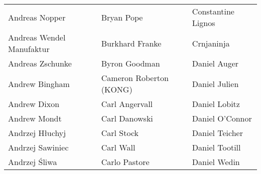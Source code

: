 \begin{tabular}{p{4.5cm}p{4.5cm}p{4.5cm}}
Andreas Nopper & Bryan Pope & Constantine Lignos \\
Andreas Wendel Manufaktur & Burkhard Franke & Crnjaninja \\
Andreas Zschunke & Byron Goodman & Daniel Auger \\
Andrew Bingham & Cameron Roberton (KONG) & Daniel Julien \\
Andrew Dixon & Carl Angervall & Daniel Lobitz \\
Andrew Mondt & Carl Danowski & Daniel O'Connor \\
Andrzej Hłuchyj & Carl Stock & Daniel Teicher \\
Andrzej Sawiniec & Carl Wall & Daniel Tootill \\
Andrzej Śliwa & Carlo Pastore & Daniel Wedin \\
\end{tabular}
\newpage
\setlength{\tabcolsep}{1mm}
